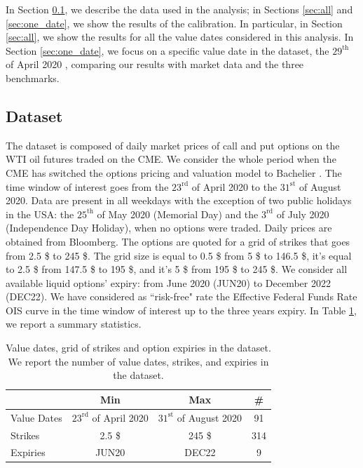 \documentclass[12pt]{article}
\theoremstyle{definition}
\theoremstyle{remark}
\numberwithin{theorem}{section}
\numberwithin{proposition}{section}
\numberwithin{lemma}{section}
\numberwithin{corollary}{section}
\numberwithin{definition}{section}
\numberwithin{remark}{section}
\numberwithin{example}{section}
\begin{document}
\smallskip

In Section \ref{sec:data_description}, we describe the data used in the analysis; in Sections \ref{sec:all} and \ref{sec:one_date}, we show the results of the calibration. In particular, in Section \ref{sec:all}, we show the results for all the value dates considered in this analysis. In Section \ref{sec:one_date}, we focus on a specific value date in the dataset, the $29^\mathrm{th}$ of April 2020 \citep[one week after the announce from the][that changed reference model into Bachelier]{CMEGroup}, comparing our results with market data and the three benchmarks.

\subsection{Dataset}\label{sec:data_description}

The dataset is composed of daily market prices of call and put options on 
the WTI oil futures traded on the CME. 
We consider the whole period when the CME has switched the options pricing and valuation model to Bachelier \citep{CMEGroup}.
The time window of interest goes from the $23^\mathrm{rd}$ of April 2020 to the $31^\mathrm{st}$ of August 2020. 
Data are present in all weekdays with the exception of two public holidays in the USA: the $25^{\mathrm{th}}$ of May 2020 (Memorial Day) and the $3^{\mathrm{rd}}$ of July 2020 (Independence Day Holiday), when no options were traded.
Daily prices are obtained from Bloomberg. The options are quoted for a grid of strikes that goes from 2.5 \$ to 245 \$. The grid size is equal to 0.5 \$ from 5 \$ to 146.5 \$, it's equal to 2.5 \$ from 147.5 \$ to 195 \$, and it's 5 \$ from 195 \$ to 245 \$. 
We consider all available liquid options' expiry: from June 2020 (JUN20) to December 2022 (DEC22). 
We have considered as ``risk-free" rate the Effective Federal Funds Rate OIS curve in the time window of interest up to the three years expiry.
In Table \ref{tab:refDates_strikes}, we report a summary statistics.


\begin{table}[H]
    \centering
\small{
    \begin{tabular}{|l|c|c|c|}
    \toprule
         & Min & Max & \# 
        \\
        \bottomrule
        \toprule
        Value Dates & $23^{\mathrm{rd}}$ of April 2020 & $31^{\mathrm{st}}$ of August 2020 & 91 \\
        Strikes & 2.5 \$ & 245 \$ & 314 \\
        Expiries & JUN20 & DEC22 & 9 \\
        \bottomrule
    \end{tabular}}
    \caption{\small{Value dates, grid of strikes and option expiries in the dataset. We report the number of value dates, strikes, and expiries in the dataset.}}
    \label{tab:refDates_strikes}
\end{table}
\end{document}
